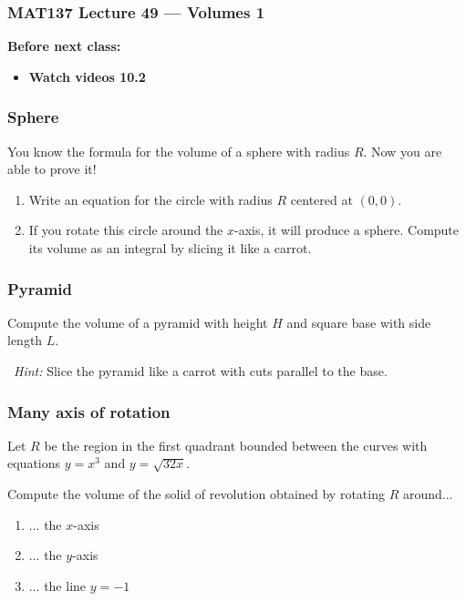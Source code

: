 \documentclass[14pt]{beamer}
\date{}
\title{}
\author{}
\begin{document}
\begin{frame}
	\frametitle{MAT137 Lecture 49 --- Volumes 1}

	\vfill
	{\bf Before next class:}
		\begin{itemize} \normalsize
			\item {\bf Watch videos 10.2}
		\end{itemize}
\end{frame}
	\begin{frame}[t]
		\frametitle{Sphere}

		You know the formula for the volume of a sphere with radius $R$. Now you are
		able to prove it!

		\begin{enumerate}
			\item Write an equation for the circle with radius $R$ centered at $(0,0)$.

			\item If you rotate this circle around the $x$-axis, it will produce a
				sphere. Compute its volume as an integral by slicing it like a carrot.
		\end{enumerate}
	\end{frame}
	\begin{frame}[t]
		\frametitle{Pyramid}

		Compute the volume of a pyramid with height $H$ and square base with side
		length $L$.

		\
 \emph{Hint:} Slice the pyramid like a carrot with cuts parallel to the base.
	\end{frame}
	\begin{frame}[t]
		\frametitle{Many axis of rotation}

		Let $R$ be the region in the first quadrant bounded between the curves with
		equations ${\displaystyle y = x^3}$ and ${\displaystyle y=\sqrt{32x}}$.

		Compute the volume of the solid of revolution obtained by rotating $R$
		around...
		\begin{enumerate}
			\item ... the $x$-axis

			\item ... the $y$-axis

			\item ... the line $y=-1$
		\end{enumerate}
	\end{frame}
\end{document}
